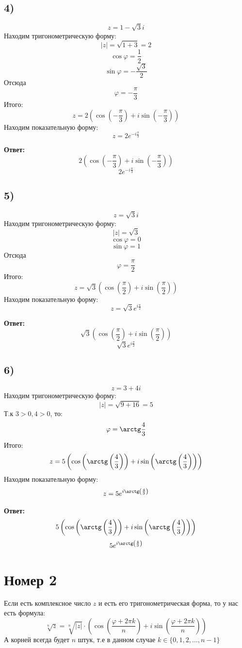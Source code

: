 \documentclass[a4paper, 12pt]{article}
\begin{document}
\subsection*{4)}
\[
z = 1 - \sqrt{3}i 
\]
Находим тригонометрическую форму:
\[
|z| = \sqrt{1 + 3} = 2
\]
\[
\cos \varphi = \frac{1}{2}
\]
\[
\sin \varphi = -\frac{\sqrt{3}}{2}
\]
Отсюда
\[
\varphi = -\frac{\pi}{3}
\]
Итого:
\[
z = 2  \left(
\cos  \left( -\frac{\pi}{3} \right)
+ 
i
\sin  \left( -\frac{\pi}{3} \right)
\right)
\]
Находим показательную форму:
\[
z = 2 e^{-i \frac{\pi}{3}}
\]
\begin{center}
\textbf{Ответ: } 
\[
2  \left(
\cos  \left( -\frac{\pi}{3} \right)
+ 
i
\sin  \left( -\frac{\pi}{3} \right)
\right)
\]
\[
 2 e^{-i \frac{\pi}{3}}
\]
\end{center}
\clearpage
\subsection*{5)}
\[
z = \sqrt{3} i
\]
Находим тригонометрическую форму:
\[
|z| = \sqrt{3}
\]
\[
\cos \varphi = 0
\]
\[
\sin \varphi = 1
\]
Отсюда
\[
\varphi = \frac{\pi}{2}
\]
Итого:
\[
z = \sqrt{3}  \left(
\cos  \left( \frac{\pi}{2} \right)
+ 
i
\sin  \left( \frac{\pi}{2} \right)
\right)
\]
Находим показательную форму:
\[
z = \sqrt{3} e^{i \frac{\pi}{2}}
\]
\begin{center}
\textbf{Ответ: } 
\[
\sqrt{3}  \left(
\cos  \left( \frac{\pi}{2} \right)
+ 
i
\sin  \left( \frac{\pi}{2} \right)
\right)
\]
\[
 \sqrt{3} e^{i \frac{\pi}{2}}
\]
\end{center}
\clearpage
\subsection*{6)}
\[
z = 3 + 4i
\]
Находим тригонометрическую форму:
\[
|z| = \sqrt{9 + 16} = 5
\]
Т.к $3 > 0, 4 > 0$, то:
\[
\varphi = \arctg \frac{4}{3}
\]
Итого:
\[
z = 5 \left(
\cos 
\left(
\arctg  \left( \frac{4}{3} \right)
\right)
+ 
i
\sin 
\left(
\arctg  \left( \frac{4}{3} \right)
\right)
\right)
\]
Находим показательную форму:
\[
z = 5 e^{i \arctg \left( \frac{4}{3} \right)}
\]
\begin{center}
\textbf{Ответ: } 
\[
5 \left(
\cos 
\left(
\arctg  \left( \frac{4}{3} \right)
\right)
+ 
i
\sin 
\left(
\arctg  \left( \frac{4}{3} \right)
\right)
\right)
\]
\[
5 e^{i \arctg \left( \frac{4}{3} \right)}
\]
\end{center}
\clearpage
\section*{Номер 2}
Если есть комплексное число $z$ и есть его тригонометрическая форма, то у нас есть формула: 
\[
\sqrt[n]{z}
=
\sqrt[n]{|z|}
\cdot
\left(
\cos 
\left(
\frac{\varphi + 2 \pi k}{n}
\right)
+
i
\sin
\left(
\frac{\varphi + 2 \pi k}{n}
\right)
\right)
\]
А корней всегда будет $n$ штук, т.е в данном случае $k \in \{0, 1, 2, \ldots, n - 1\}$
\end{document}
